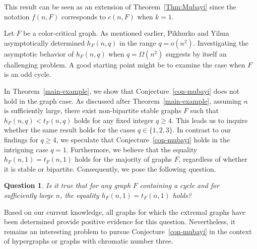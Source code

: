 \documentclass[10pt]{article}
\newtheorem{question}[theorem]{Question}
\begin{document}
This result can be seen as an extension of Theorem~\ref{Thm:Mubayi} since the notation $f(n,F)$ corresponds to $c(n,F)$ when $k=1$.


Let $F$ be a color-critical graph. As mentioned earlier, Pikhurko and Yilma \cite{pikhurko2017} asymptotically determined $h_F(n,q)$ in the range $q=o(n^2)$. Investigating the asymptotic behavior of $h_F(n,q)$ when $q=\Omega(n^2)$ suggests by itself an challenging problem.
A good starting point might be to examine the case when $F$ is an odd cycle.


In Theorem~\ref{main-example}, we show that Conjecture~\ref{con-mubayi} does not hold in the graph case.
As discussed after Theorem~\ref{main-example},
assuming $n$ is sufficiently large, there exist non-bipartite stable graphs $F$ such that $h_F(n,q)<t_F(n,q)$ holds for any fixed integer $q\geq 4$.
This leads us to inquire whether the same result holds for the cases $q\in \{1,2,3\}$.
In contrast to our findings for $q\geq 4$, we speculate that Conjecture~\ref{con-mubayi} holds in the intriguing case $q=1$.
Furthermore, we believe that the equality $h_F(n,1)=t_F(n,1)$ holds for the majority of graphs $F$, regardless of whether it is stable or bipartite.
Consequently, we pose the following question.
\begin{question}
Is it true that for any graph $F$ containing a cycle and for sufficiently large $n$, the equality $h_F(n,1)=t_F(n,1)$ holds?
\end{question}

Based on our current knowledge, all graphs for which the extremal graphs have been determined provide positive evidence for this question.
Nevertheless, it remains an interesting problem to pursue Conjecture~\ref{con-mubayi}
in the context of hypergraphs or graphs with chromatic number three.
\end{document}
